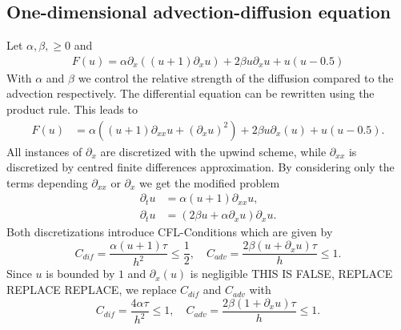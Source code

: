 \documentclass{scrartcl}
\begin{document}
	\subsection{One-dimensional advection-diffusion equation}
	Let $\alpha,\beta,\ge 0$ and 
	\begin{align*}
		F(u) = \alpha\partial_x((u+1)\partial_xu) + 2\beta u\partial_x u + u(u-0.5)
	\end{align*}
	With $\alpha$ and $\beta$ we control the relative strength of the diffusion compared to the advection respectively. The differential equation can be rewritten using the product rule. This leads to
	\begin{align*}
	F(u) &= 
	\alpha((u+1)\partial_{xx}u + (\partial_{x}u)^2) 
	+ 2\beta u\partial_x(u) 
	+ u(u-0.5).
	\end{align*}
	All instances of $\partial_{x}$ are discretized with the upwind scheme, while $\partial_{xx}$ is discretized by centred finite differences approximation.
	By considering only the terms depending $\partial_{xx}$ or $\partial_{x}$ we get the modified problem
	\begin{align*}
	\partial_{t}u &= \alpha (u+1)\partial_{xx}u, \\
	\partial_{t}u &= (2\beta u+\alpha\partial_xu)\partial_xu.
	\end{align*}
	Both discretizations introduce CFL-Conditions which are given by 
	\[ C_{dif} = \frac{\alpha(u+1)\tau}{h^2} \le \frac{1}{2}, \quad C_{adv} = \frac{2\beta(u+\partial_{x}u)\tau}{h} \le 1.\]
	Since $u$ is bounded by $1$ and $\partial_{x}(u)$ is negligible THIS IS FALSE, REPLACE REPLACE REPLACE, we replace  $C_{dif}$ and $C_{adv}$ with
	\[ C_{dif} = \frac{4\alpha\tau}{h^2} \le 1, \quad C_{adv} = \frac{2\beta(1+\partial_{x}u)\tau}{h} \le 1.\]
	
\end{document}
